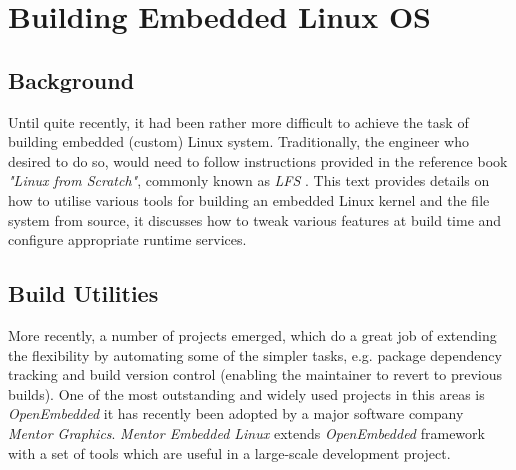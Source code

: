 \section{Building Embedded Linux OS}

\subsection{Background}

  Until quite recently, it had been rather more difficult to achieve
 the task of building embedded (custom) Linux system. Traditionally,
 the engineer who desired to do so, would need to follow instructions
 provided in the reference book \emph{"Linux from Scratch"}, commonly
 known as \emph{LFS} \cite{book:lfs}. This text provides details on
 how to utilise various tools for building an embedded Linux kernel
 and the file system from source, it discusses how to tweak various
 features at build time and configure appropriate runtime services.

\subsection{Build Utilities}
 
  More recently, a number of projects emerged, which do a great job
 of extending the flexibility by automating some of the simpler
 tasks, e.g. package dependency tracking and build version control
 (enabling the maintainer to revert to previous builds).
 One of the most outstanding and widely used projects in this areas
 is \emph{OpenEmbedded} \cite{links:oe} it has recently been adopted
 by a major software company \emph{Mentor Graphics}. \emph{Mentor
 Embedded Linux} extends \emph{OpenEmbedded} framework with a set
 of tools which are useful in a large-scale development project.
 
